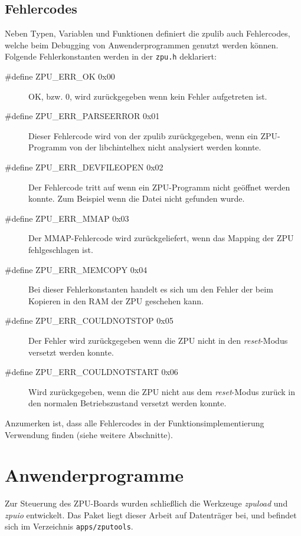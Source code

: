 \documentclass[11pt]{scrartcl}
\begin{document}
\subsection{Fehlercodes}
Neben Typen, Variablen und Funktionen definiert die zpulib auch Fehlercodes, welche beim Debugging von Anwenderprogrammen genutzt werden können.  
Folgende Fehlerkonstanten werden in der \texttt{zpu.h} deklariert:
\begin{description}
    \item[\#define ZPU\_ERR\_OK              0x00]
    OK, bzw. 0, wird zurückgegeben wenn kein Fehler aufgetreten ist. 
    
    \item[\#define ZPU\_ERR\_PARSEERROR      0x01]
    Dieser Fehlercode wird von der zpulib zurückgegeben, wenn ein ZPU-Programm von der libchintelhex nicht analysiert werden konnte. 
    
    \item[\#define ZPU\_ERR\_DEVFILEOPEN     0x02]
    Der Fehlercode tritt auf wenn ein ZPU-Programm nicht geöffnet werden konnte. Zum Beispiel wenn die Datei nicht gefunden wurde. 
    
    \item[\#define ZPU\_ERR\_MMAP            0x03]
    Der MMAP-Fehlercode wird zurückgeliefert, wenn das Mapping der ZPU fehlgeschlagen ist. 
    
    \item[\#define ZPU\_ERR\_MEMCOPY         0x04]
    Bei dieser Fehlerkonstanten handelt es sich um den Fehler der beim Kopieren in den RAM der ZPU geschehen kann. 
    
    \item[\#define ZPU\_ERR\_COULDNOTSTOP    0x05]
    Der Fehler wird zurückgegeben wenn die ZPU nicht in den \textit{reset}-Modus versetzt werden konnte.
    
    \item[\#define ZPU\_ERR\_COULDNOTSTART   0x06]
    Wird zurückgegeben, wenn die ZPU nicht aus dem \textit{reset}-Modus zurück in den normalen Betriebszustand versetzt werden konnte. 
    
\end{description}

Anzumerken ist, dass alle Fehlercodes in der Funktionsimplementierung Verwendung finden (siehe weitere Abschnitte). 

\pagebreak
\section{Anwenderprogramme}
\label{chapter_anwenderprogramme}
Zur Steuerung des ZPU-Boards wurden schließlich die Werkzeuge \emph{zpuload}   und \emph{zpuio} entwickelt. Das Paket liegt dieser Arbeit auf Datenträger bei, und befindet sich im Verzeichnis \texttt{apps/zputools}.
\end{document}
